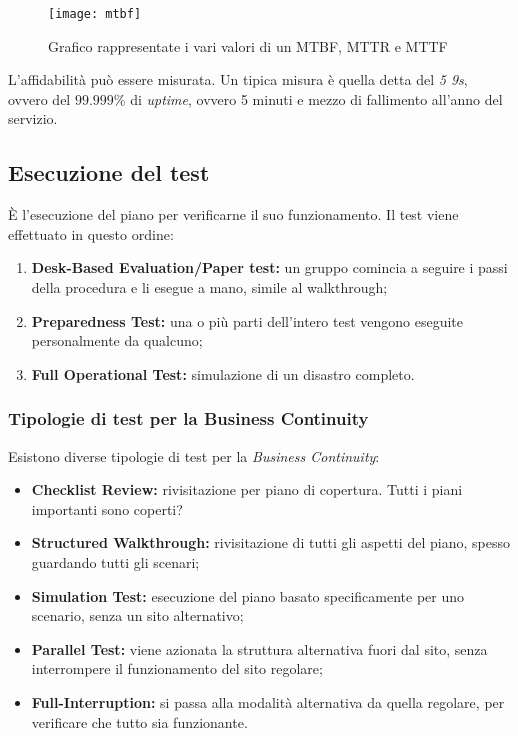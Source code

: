 \begin{figure}[H]
 \centering
 \texttt{[image: mtbf]}
 \caption{Grafico rappresentate i vari valori di un MTBF, MTTR e MTTF}
\end{figure}


L'affidabilità può essere misurata. Un tipica misura è quella detta del
\textit{5 9s}, ovvero del $99.999\%$ di \textit{uptime}, ovvero 5 minuti e
mezzo di fallimento all'anno del servizio.

\subsection{Esecuzione del test}

È l'esecuzione del piano per verificarne il suo funzionamento.
Il test viene effettuato in questo ordine:
\begin{enumerate}
  \item \textbf{Desk-Based Evaluation/Paper test:} un gruppo comincia a 
  seguire i passi della procedura e li esegue a mano, simile al walkthrough;
  \item \textbf{Preparedness Test:} una o più parti dell'intero test vengono
  eseguite personalmente da qualcuno;
  \item \textbf{Full Operational Test:} simulazione di un disastro completo.
\end{enumerate}

\subsubsection{Tipologie di test per la Business Continuity}

Esistono diverse tipologie di test per la \textit{Business Continuity}:
\begin{itemize}
  \item \textbf{Checklist Review:} rivisitazione per piano di copertura. Tutti
  i piani importanti sono coperti?
  \item \textbf{Structured Walkthrough:} rivisitazione di tutti gli aspetti
  del piano, spesso guardando tutti gli
  scenari;
  \item \textbf{Simulation Test:} esecuzione del piano basato specificamente 
  per uno scenario, senza un sito alternativo;
  \item \textbf{Parallel Test:} viene azionata la struttura alternativa fuori
  dal sito, senza interrompere il funzionamento del sito regolare;
  \item \textbf{Full-Interruption:} si passa alla modalità alternativa da 
  quella regolare, per verificare che tutto sia funzionante.
\end{itemize}

